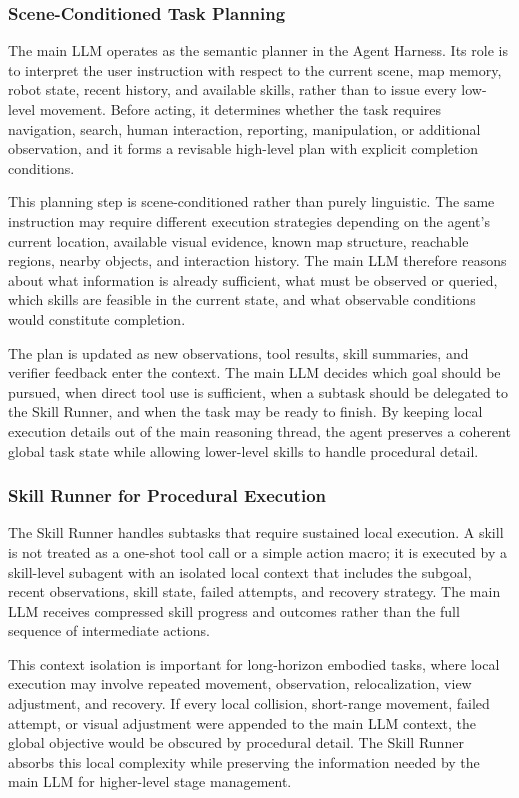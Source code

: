 \subsubsection{Scene-Conditioned Task Planning}

The main LLM operates as the semantic planner in the Agent Harness. Its
role is to interpret the user instruction with respect to the current
scene, map memory, robot state, recent history, and available skills,
rather than to issue every low-level movement. Before acting, it
determines whether the task requires navigation, search, human
interaction, reporting, manipulation, or additional observation, and it
forms a revisable high-level plan with explicit completion conditions.

This planning step is scene-conditioned rather than purely linguistic.
The same instruction may require different execution strategies
depending on the agent's current location, available visual evidence,
known map structure, reachable regions, nearby objects, and interaction
history. The main LLM therefore reasons about what information is
already sufficient, what must be observed or queried, which skills are
feasible in the current state, and what observable conditions would
constitute completion.

The plan is updated as new observations, tool results, skill summaries,
and verifier feedback enter the context. The main LLM decides which goal
should be pursued, when direct tool use is sufficient, when a subtask
should be delegated to the Skill Runner, and when the task may be ready
to finish. By keeping local execution details out of the main reasoning
thread, the agent preserves a coherent global task state while allowing
lower-level skills to handle procedural detail.

\subsubsection{Skill Runner for Procedural Execution}
The Skill Runner handles subtasks that require sustained local
execution. A skill is not treated as a one-shot tool call or a simple
action macro; it is executed by a skill-level subagent with an isolated
local context that includes the subgoal, recent observations, skill
state, failed attempts, and recovery strategy. The main LLM receives
compressed skill progress and outcomes rather than the full sequence of
intermediate actions.

This context isolation is important for long-horizon embodied tasks,
where local execution may involve repeated movement, observation,
relocalization, view adjustment, and recovery. If every local collision,
short-range movement, failed attempt, or visual adjustment were appended
to the main LLM context, the global objective would be obscured by
procedural detail. The Skill Runner absorbs this local complexity while
preserving the information needed by the main LLM for higher-level
stage management.

